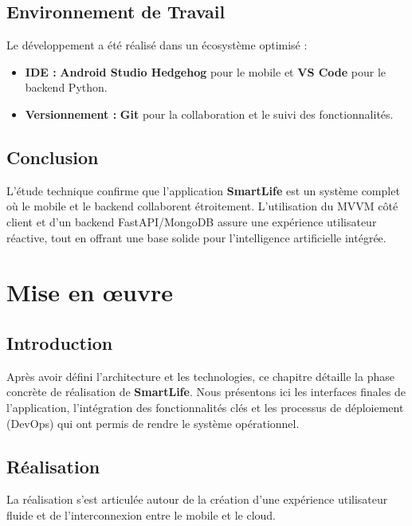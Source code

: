 \documentclass[12pt,a4paper,oneside]{report}
\begin{document}
\section{Environnement de Travail}

Le développement a été réalisé dans un écosystème optimisé :

\begin{itemize}
    \item \textbf{IDE :} \textbf{Android Studio Hedgehog} pour le mobile et \textbf{VS Code} pour le backend Python.
    \item \textbf{Versionnement :} \textbf{Git} pour la collaboration et le suivi des fonctionnalités.
\end{itemize}

\section*{Conclusion}

L'étude technique confirme que l'application \textbf{SmartLife} est un système complet où le mobile et le backend collaborent étroitement. L'utilisation du MVVM côté client et d'un backend FastAPI/MongoDB assure une expérience utilisateur réactive, tout en offrant une base solide pour l'intelligence artificielle intégrée.

\chapter{Mise en œuvre}

\section*{Introduction}

Après avoir défini l'architecture et les technologies, ce chapitre détaille la phase concrète de réalisation de \textbf{SmartLife}. Nous présentons ici les interfaces finales de l'application, l'intégration des fonctionnalités clés et les processus de déploiement (DevOps) qui ont permis de rendre le système opérationnel.

\section{Réalisation}

La réalisation s'est articulée autour de la création d'une expérience utilisateur fluide et de l'interconnexion entre le mobile et le cloud.
\end{document}
